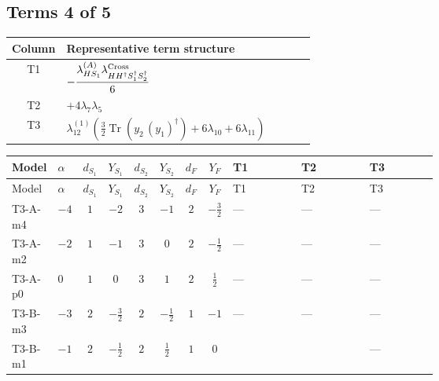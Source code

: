 \documentclass[8pt]{article}
\begin{document}
\begin{landscape}
\subsection*{Terms 4 of 5}
\begin{center}
\begin{tabular}{@{}c >{\raggedright\arraybackslash}p{0.82\linewidth}@{}}
\toprule
Column & Representative term structure \\
\midrule
T1 & \(\displaystyle -\frac{{\lambda_{HS_1}^{(A)}} {\lambda_{H H^\dagger S_1^\dagger S_2^\dagger}^{\rm Cross}}}{6}\) \\
\midrule
T2 & \(\displaystyle +4 {\lambda_{7}} {\lambda_5}\) \\
\midrule
T3 & \(\displaystyle {\lambda_{12}^{(1)}} \left(\frac{3}{2} \operatorname{Tr}\!\left({y_2}\,\left({y_1}\right)^{\dagger}\right)+6 {\lambda_{10}}+6 {\lambda_{11}}\right)\) \\
\midrule
\bottomrule
\end{tabular}
\end{center}
\smallskip
\tiny
\begin{longtable}{@{}llcccccc >{\raggedright\arraybackslash}p{0.21\linewidth} >{\raggedright\arraybackslash}p{0.21\linewidth} >{\raggedright\arraybackslash}p{0.21\linewidth}@{}}
\toprule
Model & $\alpha$ & $d_{S_1}$ & $Y_{S_1}$ & $d_{S_2}$ & $Y_{S_2}$ & $d_F$ & $Y_F$ & T1 & T2 & T3 \\
\midrule
\endfirsthead
\toprule
Model & $\alpha$ & $d_{S_1}$ & $Y_{S_1}$ & $d_{S_2}$ & $Y_{S_2}$ & $d_F$ & $Y_F$ & T1 & T2 & T3 \\
\midrule
\endhead
T3-A-m4 & $-4$ & $1$ & $-2$ & $3$ & $-1$ & $2$ & $-\frac{3}{2}$ & --- & --- & --- \\
\midrule
T3-A-m2 & $-2$ & $1$ & $-1$ & $3$ & $0$ & $2$ & $-\frac{1}{2}$ & --- & --- & --- \\
\midrule
T3-A-p0 & $0$ & $1$ & $0$ & $3$ & $1$ & $2$ & $\frac{1}{2}$ & --- & --- & --- \\
\midrule
T3-B-m3 & $-3$ & $2$ & $-\frac{3}{2}$ & $2$ & $-\frac{1}{2}$ & $1$ & $-1$ & --- & --- & --- \\
\midrule
T3-B-m1 & $-1$ & $2$ & $-\frac{1}{2}$ & $2$ & $\frac{1}{2}$ & $1$ & $0$ & \scriptsize\adjustbox{max width=\linewidth}{$\begin{gathered} -\frac{{\lambda_{HS_1}^{(A)}} {\lambda_{H H^\dagger S_1^\dagger S_2^\dagger}^{\rm Cross}}}{6}\end{gathered}$} & \scriptsize\adjustbox{max width=\linewidth}{$\begin{gathered} +4 {\lambda_{7}} {\lambda_5}\end{gathered}$} & --- \\

\end{longtable}
\end{landscape}
\end{document}
